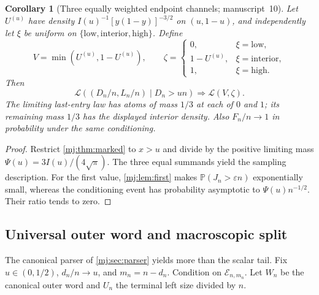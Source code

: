 \documentclass[11pt,a4paper]{article}
\newtheorem{corollary}[corollary]{Corollary}
\theoremstyle{definition}\newaliascnt{definition}{theorem}
\theoremstyle{remark}\newaliascnt{remark}{theorem}
\newcommand{\ljP}{\mathbb P}
\newcommand{\ljLaw}{\mathcal L}
\begin{document}
\begin{corollary}[Three equally weighted endpoint channels; manuscript~10]
\label{mj:cor:conditional}
Let $U^{(u)}$ have density $I(u)^{-1}[y(1-y)]^{-3/2}$ on $(u,1-u)$, and
independently let $\xi$ be uniform on $\{\mathrm{low},\mathrm{interior},
\mathrm{high}\}$. Define
\[
 V=\min(U^{(u)},1-U^{(u)}),\qquad
 \zeta=\begin{cases}0,&\xi=\mathrm{low},\\1-U^{(u)},&\xi=\mathrm{interior},\\
 1,&\xi=\mathrm{high}.\end{cases}
\]
Then
\begin{equation}
 \ljLaw((D_n/n,L_n/n)\mid D_n>un)\Longrightarrow\ljLaw(V,\zeta).
 \label{mj:eq:conditional-marked}
\end{equation}
The limiting last-entry law has atoms of mass $1/3$ at each of $0$ and $1$;
its remaining mass $1/3$ has the displayed interior density. Also
$F_n/n\to1$ in probability under the same conditioning.
\end{corollary}
\begin{proof}
Restrict \cref{mj:thm:marked} to $x>u$ and divide by the positive limiting
mass $\Psi(u)=3I(u)/(4\sqrt\pi)$. The three equal summands yield the
sampling description. For the first value, \cref{mj:lem:first} makes
$\ljP(J_n>\varepsilon n)$ exponentially small, whereas the conditioning event
has probability asymptotic to $\Psi(u)n^{-1/2}$. Their ratio tends to zero.
\end{proof}

\subsection{Universal outer word and macroscopic split}
The canonical parser of \cref{mj:sec:parser} yields more than the scalar
tail. Fix $u\in(0,1/2)$, $d_n/n\to u$, and $m_n=n-d_n$. Condition on
$\mathcal E_{n,m_n}$. Let $W_n$ be the canonical outer word and $U_n$ the
terminal left size divided by $n$.
\end{document}
